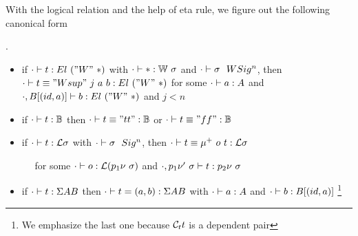 With the logical relation and the help of eta rule, we figure out the following canonical form
\begin{theorem}.
  \begin{itemize}
    \item if ${ {\cdot} \vdash {t} : {El~("W"~*)} }$ with ${ {\cdot} \vdash {*} : {{\mathbb{W}}~\sigma} }$ and ${ {\cdot} \vdash {\sigma} \ \ WSig^{n} }$, then ${ {\cdot} \vdash {t \equiv "Wsup"~j~a~b} : {El~("W"~*)} }$ for some ${ {\cdot} \vdash {a} : {A} }$ and ${ {\cdot, B[(id, a)]} \vdash {b} : {El~("W"~*)} }$ and $j < n$
    \item if ${ {\cdot} \vdash {t} : {\mathbb{B}} }$ then ${ {\cdot} \vdash {t \equiv "tt"} : {\mathbb{B}} }$ or ${ {\cdot} \vdash {t \equiv "ff"} : {\mathbb{B}} }$ 
    \item if ${ {\cdot} \vdash {t} : {{\mathcal{L}}\sigma} }$ with ${ {\cdot} \vdash {\sigma} \ \ Sig^{n} }$, then ${ {\cdot} \vdash {t \equiv \mu^+~o~t} : {{\mathcal{L}}\sigma} }$ 
    
      $\quad$ for some ${ {\cdot} \vdash {o} : {{\mathcal{L}}(p_1\nu~\sigma)} }$ and ${ {\cdot, p_1\nu'~\sigma} \vdash {t} : {p_2\nu~\sigma} }$
    \item if ${ {\cdot} \vdash {t} : {\Sigma A B} }$ then ${ {\cdot} \vdash {t = (a, b)} : {\Sigma A B} }$ with ${ {\cdot} \vdash {a} : {A} }$ and ${ {\cdot} \vdash {b} : {B[(id, a)]} }$
    \footnote{We emphasize the last one because ${\mathcal{C}_t} t$ is a dependent pair}
  \end{itemize}
\end{theorem}

